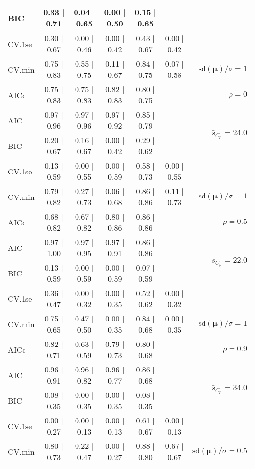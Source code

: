 \documentclass[12pt]{article}
\newcommand{\mr}[1]{\mathrm{#1}}
\newcommand{\bm}[1]{\mathbf{#1}}
\begin{document}
\begin{table}[p]
\begin{center}
\begin{tabular}{l*{5}{c}|r}
BIC & 0.33 $\mid$ 0.71 & 0.04 $\mid$ 0.65 & 0.00 $\mid$ 0.50 & 0.15 $\mid$ 0.65 & & \\
 \hline 
CV.1se & 0.30 $\mid$ 0.67 & 0.00 $\mid$ 0.46 & 0.00 $\mid$ 0.42 & 0.43 $\mid$ 0.67 & 0.00 $\mid$ 0.42 &\\
CV.min & 0.75 $\mid$ 0.83 & 0.55 $\mid$ 0.75 & 0.11 $\mid$ 0.67 & 0.84 $\mid$ 0.75 & 0.07 $\mid$ 0.58 &  $\mr{sd}(\bm{\mu})/\sigma=1$ \\
AICc & 0.75 $\mid$ 0.83 & 0.75 $\mid$ 0.83 & 0.82 $\mid$ 0.83 & 0.80 $\mid$ 0.75 & & $\rho=0$ \\
AIC & 0.97 $\mid$ 0.96 & 0.97 $\mid$ 0.96 & 0.97 $\mid$ 0.92 & 0.85 $\mid$ 0.79 & & \multirow{2}{*}{$\bar{s}_{C_p}$ = 24.0} \\
BIC & 0.20 $\mid$ 0.67 & 0.16 $\mid$ 0.67 & 0.00 $\mid$ 0.42 & 0.29 $\mid$ 0.62 & & \\
 \hline 
CV.1se & 0.13 $\mid$ 0.59 & 0.00 $\mid$ 0.55 & 0.00 $\mid$ 0.59 & 0.58 $\mid$ 0.73 & 0.00 $\mid$ 0.55 &\\
CV.min & 0.79 $\mid$ 0.82 & 0.27 $\mid$ 0.73 & 0.06 $\mid$ 0.68 & 0.86 $\mid$ 0.86 & 0.11 $\mid$ 0.73 &  $\mr{sd}(\bm{\mu})/\sigma=1$ \\
AICc & 0.68 $\mid$ 0.82 & 0.67 $\mid$ 0.82 & 0.80 $\mid$ 0.86 & 0.86 $\mid$ 0.86 & & $\rho=0.5$ \\
AIC & 0.97 $\mid$ 1.00 & 0.97 $\mid$ 0.95 & 0.97 $\mid$ 0.91 & 0.86 $\mid$ 0.86 & & \multirow{2}{*}{$\bar{s}_{C_p}$ = 22.0} \\
BIC & 0.13 $\mid$ 0.59 & 0.00 $\mid$ 0.59 & 0.00 $\mid$ 0.59 & 0.07 $\mid$ 0.59 & & \\
 \hline 
CV.1se & 0.36 $\mid$ 0.47 & 0.00 $\mid$ 0.32 & 0.00 $\mid$ 0.35 & 0.52 $\mid$ 0.62 & 0.00 $\mid$ 0.32 &\\
CV.min & 0.75 $\mid$ 0.65 & 0.47 $\mid$ 0.50 & 0.00 $\mid$ 0.35 & 0.84 $\mid$ 0.68 & 0.00 $\mid$ 0.35 &  $\mr{sd}(\bm{\mu})/\sigma=1$ \\
AICc & 0.82 $\mid$ 0.71 & 0.63 $\mid$ 0.59 & 0.79 $\mid$ 0.73 & 0.80 $\mid$ 0.68 & & $\rho=0.9$ \\
AIC & 0.96 $\mid$ 0.91 & 0.96 $\mid$ 0.82 & 0.96 $\mid$ 0.77 & 0.86 $\mid$ 0.68 & & \multirow{2}{*}{$\bar{s}_{C_p}$ = 34.0} \\
BIC & 0.08 $\mid$ 0.35 & 0.00 $\mid$ 0.35 & 0.00 $\mid$ 0.35 & 0.08 $\mid$ 0.35 & & \\
 \hline 
CV.1se & 0.00 $\mid$ 0.27 & 0.00 $\mid$ 0.13 & 0.00 $\mid$ 0.13 & 0.61 $\mid$ 0.67 & 0.00 $\mid$ 0.13 &\\
CV.min & 0.80 $\mid$ 0.73 & 0.22 $\mid$ 0.47 & 0.00 $\mid$ 0.27 & 0.88 $\mid$ 0.80 & 0.67 $\mid$ 0.67 &  $\mr{sd}(\bm{\mu})/\sigma=0.5$ \\

\end{tabular}
\end{center}
\end{table}
\end{document}
